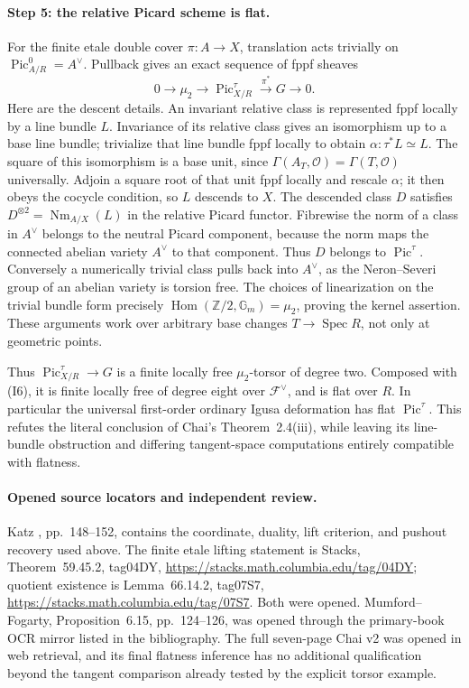 \paragraph{Step 5: the relative Picard scheme is flat.}
For the finite etale double cover $\pi:A\to X$, translation acts
trivially on $\operatorname{Pic}^0_{A/R}=A^\vee$. Pullback gives an
exact sequence of fppf sheaves
\[
 0\longrightarrow\mu_2\longrightarrow
 \operatorname{Pic}^{\tau}_{X/R}\stackrel{\pi^*}{\longrightarrow}
 G\longrightarrow0.                                    \tag{I7}
\]
Here are the descent details. An invariant relative class is represented
fppf locally by a line bundle $L$. Invariance of its relative class gives an isomorphism up to a base line bundle; trivialize that line bundle fppf locally to obtain
$\alpha:\tau^*L\simeq L$. The square of this isomorphism is a base
unit, since $\Gamma(A_T,\mathcal O)=\Gamma(T,\mathcal O)$ universally.
Adjoin a square root of that unit fppf locally and rescale $\alpha$;
it then obeys the cocycle condition, so $L$ descends to $X$.
The descended class $D$ satisfies
$D^{\otimes2}=\operatorname{Nm}_{A/X}(L)$ in the relative Picard
functor. Fibrewise the norm of a class in $A^\vee$ belongs to the
neutral Picard component, because the norm maps the connected
abelian variety $A^\vee$ to that component. Thus $D$ belongs to
$\operatorname{Pic}^{\tau}$.
Conversely a numerically trivial class pulls back into $A^\vee$, as
the Neron--Severi group of an abelian variety is torsion free.
The choices of linearization on the trivial bundle form precisely
$\operatorname{Hom}(\mathbb Z/2,\mathbb G_m)=\mu_2$, proving the
kernel assertion. These arguments work over arbitrary base changes
$T\to\operatorname{Spec}R$, not only at geometric points.

Thus $\operatorname{Pic}^{\tau}_{X/R}\to G$ is a finite locally free
$\mu_2$-torsor of degree two. Composed with (I6), it is finite locally
free of degree eight over $\mathcal F^\vee$, and is flat over $R$.
In particular the universal first-order ordinary Igusa deformation has
flat $\operatorname{Pic}^{\tau}$.
This refutes the literal conclusion of Chai's Theorem~2.4(iii),
while leaving its line-bundle obstruction and differing tangent-space
computations entirely compatible with flatness.

\paragraph{Opened source locators and independent review.}
Katz \cite{DGJ_Katz1981}, pp.~148--152, contains the coordinate,
duality, lift criterion, and pushout recovery used above. The finite
etale lifting statement is Stacks, Theorem~59.45.2, tag04DY,
\url{https://stacks.math.columbia.edu/tag/04DY}; quotient existence is
Lemma~66.14.2, tag07S7,
\url{https://stacks.math.columbia.edu/tag/07S7}. Both were opened.
Mumford--Fogarty, Proposition~6.15, pp.~124--126, was opened through
the primary-book OCR mirror listed in the bibliography.
The full seven-page Chai v2 was opened in web retrieval, and its final
flatness inference has no additional qualification beyond the tangent
comparison already tested by the explicit torsor example.

